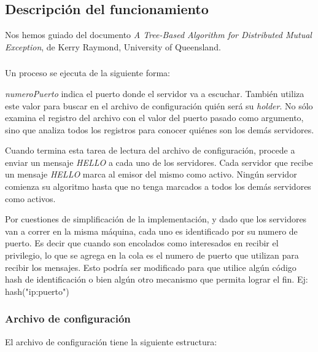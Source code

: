 \subsection{Descripción del funcionamiento}

Nos hemos guiado del documento \emph{A Tree-Based Algorithm for Distributed
Mutual Exception}, de Kerry Raymond, University of Queensland.

\subsubsection{}

Un proceso  se ejecuta de la siguiente forma:


\emph{numeroPuerto} indica el puerto donde el servidor va a escuchar. También
utiliza este valor para buscar en el archivo de configuración
 quién será su \emph{holder}. No sólo examina el
registro del archivo con el valor del puerto pasado como argumento, sino que
analiza todos los registros para conocer quiénes son los demás servidores.

Cuando termina esta tarea de lectura del archivo de configuración, procede a
enviar un mensaje \emph{HELLO} a cada uno de los servidores. Cada servidor que
recibe un mensaje \emph{HELLO} marca al emisor del mismo como activo. Ningún
servidor comienza su algoritmo hasta que no tenga marcados a todos los demás
servidores como activos.

Por cuestiones de simplificación de la implementación, y dado que los servidores
van a correr en la misma máquina, cada uno es identificado por su numero de
puerto. Es decir que cuando son encolados como interesados en recibir el 
privilegio, lo que se agrega en la cola es el numero de puerto que utilizan para
recibir los mensajes. Esto podría ser modificado para que utilice algún código
hash de identificación o bien algún otro mecanismo que permita lograr el fin. 
Ej: hash("ip:puerto")


\subsubsection{Archivo de configuración }

El archivo de configuración tiene la siguiente estructura:


